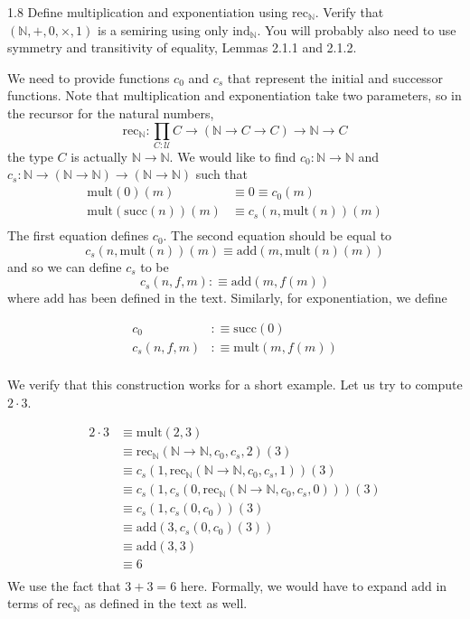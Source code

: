 \documentclass[14pt]{extarticle}
\newcommand{\N}{{\mathbb N}}
\newcommand{\0}{{\mathbf 0}}
\newcommand{\1}{{\mathbf 1}}
\newcommand{\2}{{\mathbf 2}}
\newcommand{\UU}{{\mathcal U}}
\newcommand{\rec}{\mathrm{rec}}
\newcommand{\mult}{\mathrm{mult}}
\newcommand{\su}{\mathrm{succ}}
\newcommand{\add}{\mathrm{add}}
\newcommand{\ind}{\mathrm{ind}}
\begin{document}
\begin{prob}{1.8}{}
Define multiplication and exponentiation using $\rec_{\N}$. Verify that $(\N,+,0,\times,1)$ is a semiring using only $\ind_{\N}$. You will probably also need to use symmetry and transitivity of equality, Lemmas 2.1.1 and 2.1.2.
\end{prob}
We need to provide functions $c_0$ and $c_s$ that represent the initial and successor functions. Note that multiplication and exponentiation take two parameters, so in the recursor for the natural numbers,
\[\rec_{\N} :\prod_{C:\UU} C \to (\N \to C \to C) \to \N \to C\]
the type $C$ is actually $\N \to \N$. We would like to find $c_0 : \N \to \N$ and $c_s : \N \to (\N \to \N) \to (\N \to \N)$ such that 
\begin{align*}
\mult(0)(m) &\equiv 0 \equiv c_0(m) \\
\mult(\su(n))(m) &\equiv c_s(n,\mult(n))(m) \\
\end{align*}
The first equation defines $c_0$. The second equation should be equal to 
\[c_s(n,\mult(n))(m) \equiv \add(m,\mult(n)(m))\] and so we can define $c_s$ to be 
\[c_s(n,f,m) :\equiv \add(m,f(m))\] where $\add$ has been defined in the text.
Similarly, for exponentiation, we define

\begin{align*}
c_0 &:\equiv \su(0)\\
c_s(n,f,m) &:\equiv \mult(m,f(m))\\
\end{align*}

We verify that this construction works for a short example. Let us try to compute $2\cdot 3$.

\begin{align*}
2 \cdot 3 &\equiv \mult(2,3) \\
&\equiv \rec_{\N}(\N \to \N, c_0, c_s,2)(3) \\
&\equiv c_s(1,\rec_{\N}(\N \to \N, c_0, c_s,1))(3) \\
&\equiv c_s(1,c_s(0, \rec_{\N}(\N \to \N, c_0, c_s,0)))(3) \\
&\equiv c_s(1,c_s(0, c_0))(3) \\
&\equiv \add(3, c_s(0,c_0)(3)) \\
&\equiv \add(3, 3) \\
&\equiv 6\\
\end{align*}
We use the fact that $3+3 = 6$ here. Formally, we would have to expand $\add$ in terms of $\rec_{\N}$ as defined in the text as well.\\\\
\end{document}
